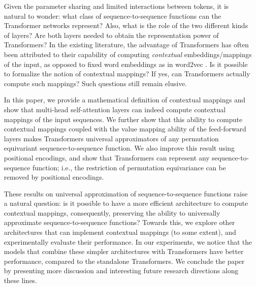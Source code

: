Given the parameter sharing and limited interactions between tokens, it is natural to wonder: what class of sequence-to-sequence functions can the Transformer networks represent? Also, what is the role of the two different kinds of layers? Are both layers needed to obtain the representation power of Transformers? 
In the existing literature, the advantage of Transformers has often been attributed to their capability of computing \textit{contextual} embeddings/mappings of the input, as opposed to fixed word embeddings as in word2vec \citep{mikolov2013distributed}. Is it possible to formalize the notion of contextual mappings? If yes,
can Transformers actually compute such mappings? Such questions still remain elusive.

In this paper, we provide a mathematical definition of contextual mappings and show that multi-head self-attention layers can indeed compute contextual mappings of the input sequences. We further show that this ability to compute contextual mappings coupled with the value mapping ability of the feed-forward layers makes Transformers universal approximators of any permutation equivariant sequence-to-sequence function. We also improve this result using positional encodings, and show that Transformers can represent any sequence-to-sequence function; i.e., the restriction of permutation equivariance can be removed by positional encodings.


These results on universal approximation of sequence-to-sequence functions raise a natural question:
is it possible to have a more efficient architecture to compute contextual mappings, consequently, preserving the ability to universally approximate sequence-to-sequence functions? Towards this, we explore other architectures that can implement contextual mappings (to some extent), and experimentally evaluate their performance. In our experiments, we notice that the models that combine these simpler architectures with Transformers have better performance, compared to the standalone Transformers.
We conclude the paper by presenting more discussion and interesting future research directions along these lines.

